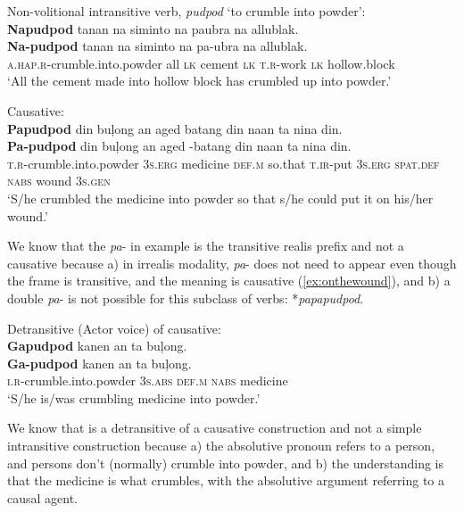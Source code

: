 \ea
Non-volitional intransitive verb, \textit{pudpod} ‘to crumble into powder’: \\
\textbf{Napudpod}  tanan  na  siminto  na  paubra  na  allublak. \\\smallskip
\gll \textbf{Na-pudpod}  tanan  na  siminto  na  pa-ubra  na  allublak. \\
\textsc{a.hap.r}-crumble.into.powder  all  \textsc{lk}  cement  \textsc{lk}  \textsc{t.r}-work  \textsc{lk}  hollow.block \\
\glt ‘All the cement made into hollow block has crumbled up into powder.’
\z

\ea
\label{ex:putitonwound}
Causative: \\
\textbf{Papudpod}  din  buļong  an  aged  batang din  naan  ta  nina  din. \\\smallskip
\gll \textbf{Pa-pudpod}  din  buļong  an  aged  \emptyset{}-batang din  naan  ta  nina  din. \\
\textsc{t.r}-crumble.into.powder  3\textsc{s.erg}  medicine  \textsc{def.m}  so.that  \textsc{t.ir}-put
3\textsc{s.erg}  \textsc{spat.def  nabs}  wound  3\textsc{s.gen} \\
\glt `S/he crumbled the medicine into powder so that s/he could put it on his/her wound.’
\z

We know that the \textit{pa}{}- in example  is the transitive realis prefix and not a causative because a) in irrealis modality, \textit{pa}{}- does not need to appear even though the frame is transitive, and the meaning is causative (\ref{ex:onthewound}), and b) a double \textit{pa}{}- is not possible for this subclass of verbs: *\textit{papapudpod}.

\ea
\label{bkm:Ref329259219}
Detransitive (Actor voice) of causative: \\
\textbf{Gapudpod}  kanen  an  ta  buļong. \\\smallskip
\gll \textbf{Ga-pudpod}  kanen  an  ta  buļong. \\
\textsc{i.r}-crumble.into.powder  3\textsc{s.abs}  \textsc{def.m}  \textsc{nabs}  medicine \\
\glt ‘S/he is/was crumbling medicine into powder.’
\z

We know that  is a detransitive of a causative construction and not a simple intransitive construction because a) the absolutive pronoun refers to a person, and persons don’t (normally) crumble into powder, and b) the understanding is that the medicine is what crumbles, with the absolutive argument referring to a causal agent.

